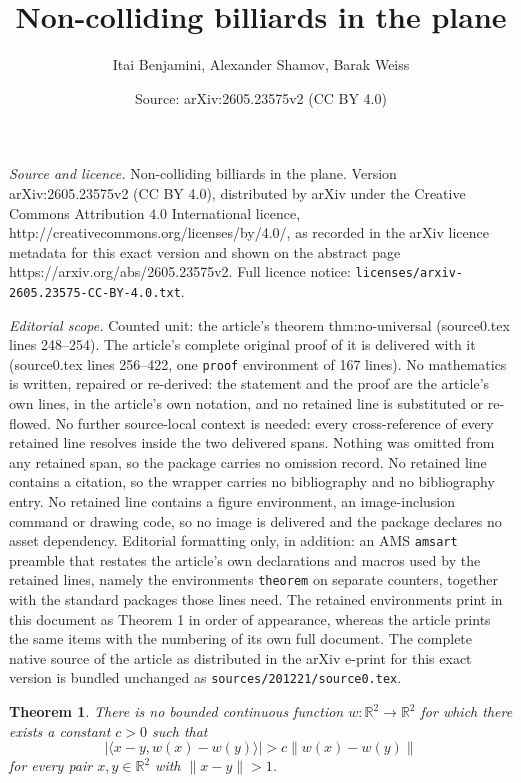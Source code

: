 \documentclass[10pt,a4paper]{amsart}
\title{Non-colliding billiards in the plane}
\author{Itai Benjamini, Alexander Shamov, Barak Weiss}
\date{Source: arXiv:2605.23575v2 (CC BY 4.0)}
\newtheorem{theorem}{Theorem}
\begin{document}
\maketitle

\noindent\emph{Source and licence.} Non-colliding billiards in the plane. Version arXiv:2605.23575v2 (CC BY 4.0), distributed by arXiv under the Creative Commons Attribution 4.0 International licence, http://creativecommons.org/licenses/by/4.0/, as recorded in the arXiv licence metadata for this exact version and shown on the abstract page https://arxiv.org/abs/2605.23575v2. Full licence notice: \texttt{licenses/arxiv-2605.23575-CC-BY-4.0.txt}.\par\smallskip

\noindent\textit{Editorial scope.} Counted unit: the article's theorem thm:no-universal (source0.tex lines 248--254). The article's complete original proof of it is delivered with it (source0.tex lines 256--422, one \texttt{proof} environment of 167 lines). No mathematics is written, repaired or re-derived: the statement and the proof are the article's own lines, in the article's own notation, and no retained line is substituted or re-flowed.  No further source-local context is needed: every cross-reference of every retained line resolves inside the two delivered spans.  Nothing was omitted from any retained span, so the package carries no omission record.  No retained line contains a citation, so the wrapper carries no bibliography and no bibliography entry.  No retained line contains a figure environment, an image-inclusion command or drawing code, so no image is delivered and the package declares no asset dependency.  Editorial formatting only, in addition: an AMS \texttt{amsart} preamble that restates the article's own declarations and macros used by the retained lines, namely the environments \texttt{theorem} on separate counters, together with the standard packages those lines need.  The retained environments print in this document as Theorem 1 in order of appearance, whereas the article prints the same items with the numbering of its own full document.  The complete native source of the article as distributed in the arXiv e-print for this exact version is bundled unchanged as \texttt{sources/201221/source0.tex}.
\begin{theorem}\label{thm:no-universal}
There is no bounded continuous function $w:\mathbb R^2\to\mathbb R^2$ for which there exists a constant $c>0$ such that
\begin{equation}\label{eq:universal-abs}
\bigl|\langle x-y,w(x)-w(y)\rangle\bigr|>c\|w(x)-w(y)\|
\end{equation}
for every pair $x,y\in\mathbb R^2$ with $\|x-y\|>1$.
\end{theorem}
\end{document}
